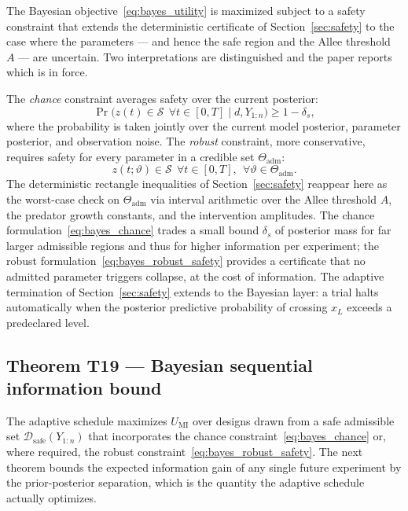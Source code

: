 The Bayesian objective~\eqref{eq:bayes_utility} is maximized subject to a safety constraint that extends the deterministic certificate of Section~\ref{sec:safety} to the case where the parameters --- and hence the safe region and the Allee threshold $A$ --- are uncertain. Two interpretations are distinguished and the paper reports which is in force.

The \emph{chance} constraint averages safety over the current posterior:
\begin{equation}
\Pr\!\bigl(z(t) \in \mathcal{S}\ \ \forall t \in [0,T] \mid d, Y_{1:n}\bigr) \ge 1 - \delta_s,
\label{eq:bayes_chance}
\end{equation}
where the probability is taken jointly over the current model posterior, parameter posterior, and observation noise. The \emph{robust} constraint, more conservative, requires safety for every parameter in a credible set $\Theta_{\mathrm{adm}}$:
\begin{equation}
z(t; \vartheta) \in \mathcal{S}\ \ \forall t \in [0,T],\ \ \forall \vartheta \in \Theta_{\mathrm{adm}}.
\label{eq:bayes_robust_safety}
\end{equation}
The deterministic rectangle inequalities of Section~\ref{sec:safety} reappear here as the worst-case check on $\Theta_{\mathrm{adm}}$ via interval arithmetic over the Allee threshold $A$, the predator growth constants, and the intervention amplitudes. The chance formulation~\eqref{eq:bayes_chance} trades a small bound $\delta_s$ of posterior mass for far larger admissible regions and thus for higher information per experiment; the robust formulation~\eqref{eq:bayes_robust_safety} provides a certificate that no admitted parameter triggers collapse, at the cost of information. The adaptive termination of Section~\ref{sec:safety} extends to the Bayesian layer: a trial halts automatically when the posterior predictive probability of crossing $x_L$ exceeds a predeclared level.

\subsection{Theorem T19 --- Bayesian sequential information bound}
\label{subsec:bayes:T19}

The adaptive schedule maximizes $U_{\mathrm{MI}}$ over designs drawn from a safe admissible set $\mathcal{D}_{\mathrm{safe}}(Y_{1:n})$ that incorporates the chance constraint~\eqref{eq:bayes_chance} or, where required, the robust constraint~\eqref{eq:bayes_robust_safety}. The next theorem bounds the expected information gain of any single future experiment by the prior-posterior separation, which is the quantity the adaptive schedule actually optimizes.

